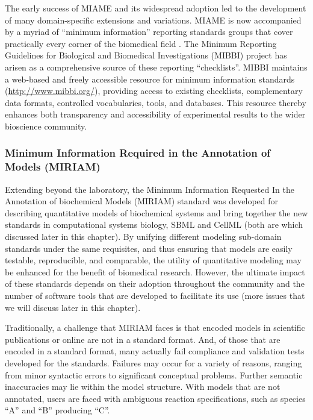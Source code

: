 The early success of MIAME and its widespread adoption led to the
development of many domain-specific extensions and variations. MIAME is
now accompanied by a myriad of ``minimum information'' reporting
standards groups that cover practically every corner of the biomedical
field \autocite{naturebiotechnology2006}. The Minimum Reporting
Guidelines for Biological and Biomedical Investigations (MIBBI)
\autocite{taylor2008promoting} project has arisen as a comprehensive
source of these reporting ``checklists''. MIBBI maintains a web-based
and freely accessible resource for minimum information standards
(\url{http://www.mibbi.org/}), providing access to existing checklists,
complementary data formats, controlled vocabularies, tools, and
databases. This resource thereby enhances both transparency and
accessibility of experimental results to the wider bioscience community.

\subsubsection{Minimum Information Required in the Annotation of Models
(MIRIAM)}

Extending beyond the laboratory, the Minimum Information Requested In
the Annotation of biochemical Models (MIRIAM) standard
\autocite{novere2005minimum} \autocite{le2006model} was developed for
describing quantitative models of biochemical systems and bring together
the new standards in computational systems biology, SBML and CellML
(both are which discussed later in this chapter). By unifying different
modeling sub-domain standards under the same requisites, and thus
ensuring that models are easily testable, reproducible, and comparable,
the utility of quantitative modeling may be enhanced for the benefit of
biomedical research. However, the ultimate impact of these standards
depends on their adoption throughout the community and the number of
software tools that are developed to facilitate its use (more issues
that we will discuss later in this chapter).

Traditionally, a challenge that MIRIAM faces is that encoded models in
scientific publications or online are not in a standard format. And, of
those that are encoded in a standard format, many actually fail
compliance and validation tests developed for the standards. Failures
may occur for a variety of reasons, ranging from minor syntactic errors
to significant conceptual problems. Further semantic inaccuracies may
lie within the model structure. With models that are not annotated,
users are faced with ambiguous reaction specifications, such as species
``A'' and ``B'' producing ``C''.

